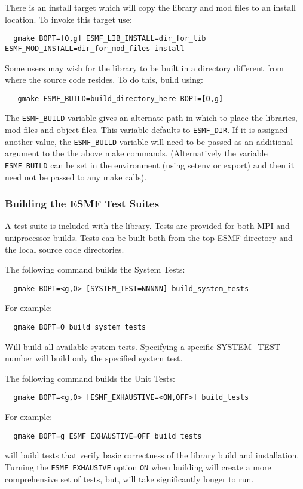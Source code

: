 There is an install target which will copy the library and mod files to an
install location.  To invoke this target use:
\begin{verbatim}
  gmake BOPT=[O,g] ESMF_LIB_INSTALL=dir_for_lib ESMF_MOD_INSTALL=dir_for_mod_files install 
\end{verbatim}

Some users may wish for the library to be built in a directory different from 
where the source code resides.  To do this, build using:
\begin{verbatim}
   gmake ESMF_BUILD=build_directory_here BOPT=[O,g]
\end{verbatim}

The {\tt ESMF\_BUILD} variable gives an alternate path in which to place the libraries,
mod files and object files.  This variable defaults to {\tt ESMF\_DIR}.  If it is 
assigned another value, the {\tt ESMF\_BUILD} variable will need to be passed as
an additional argument to the the above make commands.  (Alternatively the variable
{\tt ESMF\_BUILD} can be set in the environment (using setenv or export) and then it 
need not be passed to any make calls).


\subsubsection{Building the ESMF Test Suites}
\label{BuildTestSuite}
A test suite is included with the library. Tests are provided for both MPI
and uniprocessor builds. Tests can be built both from the top ESMF directory and
the local source code directories.

\noindent The following command builds the System Tests:
\begin{verbatim}
  gmake BOPT=<g,O> [SYSTEM_TEST=NNNNN] build_system_tests
\end{verbatim}

For example:
\begin{verbatim}
  gmake BOPT=O build_system_tests
\end{verbatim}
Will build all available system tests. Specifying a specific SYSTEM\_TEST number will build only the specified system test.

\noindent The following command builds the Unit Tests:
\begin{verbatim}
  gmake BOPT=<g,O> [ESMF_EXHAUSTIVE=<ON,OFF>] build_tests
\end{verbatim}

For example:
\begin{verbatim}
  gmake BOPT=g ESMF_EXHAUSTIVE=OFF build_tests
\end{verbatim}
will build tests that verify basic correctness of the library build and installation. Turning the {\tt ESMF\_EXHAUSIVE} option {\tt ON} when building will create a more comprehensive set of tests, but, will take significantly longer to run. 

